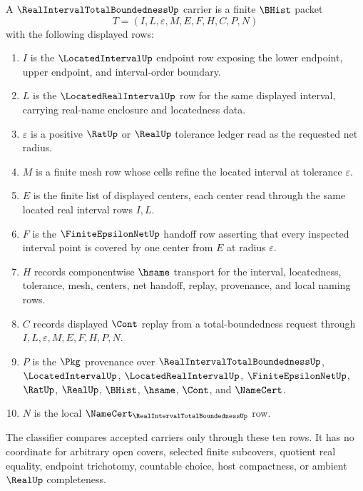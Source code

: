 \begin{definition}
\label{def:real-interval-total-boundedness-carrier}
A $\RealIntervalTotalBoundednessUp$ carrier is a finite $\BHist$ packet
$$
T=(I,L,\varepsilon,M,E,F,H,C,P,N)
$$
with the following displayed rows:
\begin{enumerate}
\item $I$ is the $\LocatedIntervalUp$ endpoint row exposing the lower endpoint, upper endpoint, and interval-order boundary.
\item $L$ is the $\LocatedRealIntervalUp$ row for the same displayed interval, carrying real-name enclosure and locatedness data.
\item $\varepsilon$ is a positive $\RatUp$ or $\RealUp$ tolerance ledger read as the requested net radius.
\item $M$ is a finite mesh row whose cells refine the located interval at tolerance $\varepsilon$.
\item $E$ is the finite list of displayed centers, each center read through the same located real interval rows $I,L$.
\item $F$ is the $\FiniteEpsilonNetUp$ handoff row asserting that every inspected interval point is covered by one center from $E$ at radius $\varepsilon$.
\item $H$ records componentwise $\hsame$ transport for the interval, locatedness, tolerance, mesh, centers, net handoff, replay, provenance, and local naming rows.
\item $C$ records displayed $\Cont$ replay from a total-boundedness request through $I,L,\varepsilon,M,E,F,H,P,N$.
\item $P$ is the $\Pkg$ provenance over $\RealIntervalTotalBoundednessUp$, $\LocatedIntervalUp$, $\LocatedRealIntervalUp$, $\FiniteEpsilonNetUp$, $\RatUp$, $\RealUp$, $\BHist$, $\hsame$, $\Cont$, and $\NameCert$.
\item $N$ is the local $\NameCert_{\RealIntervalTotalBoundednessUp}$ row.
\end{enumerate}
The classifier compares accepted carriers only through these ten rows. It has no coordinate for arbitrary open covers, selected finite subcovers, quotient real equality, endpoint trichotomy, countable choice, host compactness, or ambient $\RealUp$ completeness.
\end{definition}

